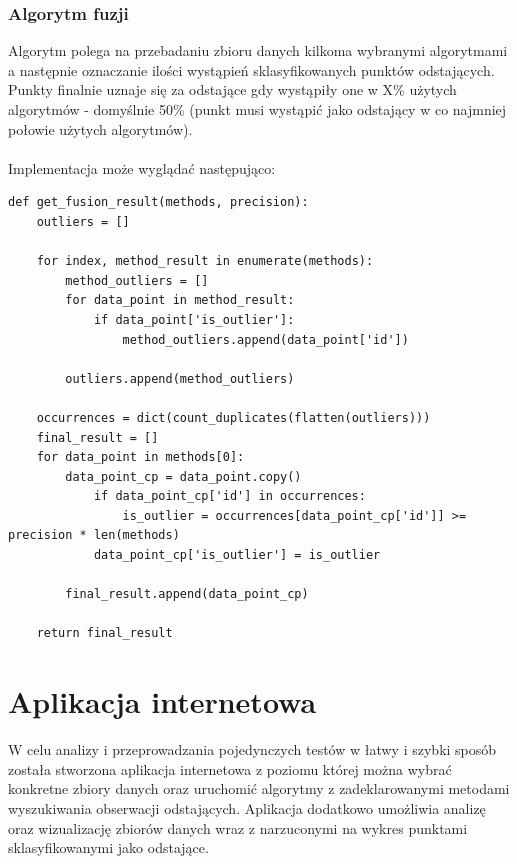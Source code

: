\documentclass[eng,printmode]{mgr}
\begin{document}
\subsection{Algorytm fuzji}
Algorytm polega na przebadaniu zbioru danych kilkoma wybranymi algorytmami a następnie oznaczanie ilości wystąpień sklasyfikowanych punktów odstających. Punkty finalnie uznaje się za odstające gdy wystąpiły one w X\% użytych algorytmów - domyślnie 50\% (punkt musi wystąpić jako odstający w co najmniej połowie użytych algorytmów).
\\\\
Implementacja może wyglądać następująco:
\\
\begin{lstlisting}
def get_fusion_result(methods, precision):
    outliers = []

    for index, method_result in enumerate(methods):
        method_outliers = []
        for data_point in method_result:
            if data_point['is_outlier']:
                method_outliers.append(data_point['id'])

        outliers.append(method_outliers)

    occurrences = dict(count_duplicates(flatten(outliers)))
    final_result = []
    for data_point in methods[0]:
        data_point_cp = data_point.copy()
            if data_point_cp['id'] in occurrences:
                is_outlier = occurrences[data_point_cp['id']] >= precision * len(methods)
            data_point_cp['is_outlier'] = is_outlier

        final_result.append(data_point_cp)

    return final_result
\end{lstlisting}

\chapter{Aplikacja internetowa}
W celu analizy i przeprowadzania pojedynczych testów w łatwy i szybki sposób została stworzona aplikacja internetowa z poziomu której można wybrać konkretne zbiory danych oraz uruchomić algorytmy z zadeklarowanymi metodami wyszukiwania obserwacji odstających. Aplikacja dodatkowo umożliwia analizę oraz wizualizację zbiorów danych wraz z narzuconymi na wykres punktami sklasyfikowanymi jako odstające.
\end{document}

